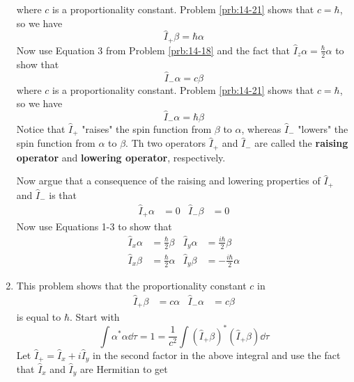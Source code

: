 \documentclass[../notes.tex]{subfiles}
\begin{document}
\begin{enumerate}[label={\textbf{14-\arabic*.}},ref={14-\arabic*}]
    where $c$ is a proportionality constant. Problem \ref{prb:14-21} shows that $c=\hbar$, so we have
    \begin{equation*}
        \hat{I}_+\beta = \hbar\alpha\tag{1}
    \end{equation*}
    Now use Equation 3 from Problem \ref{prb:14-18} and the fact that $\hat{I}_z\alpha=\frac{\hbar}{2}\alpha$ to show that
    \begin{equation*}
        \hat{I}_-\alpha = c\beta
    \end{equation*}
    where $c$ is a proportionality constant. Problem \ref{prb:14-21} shows that $c=\hbar$, so we have
    \begin{equation*}
        \hat{I}_-\alpha = \hbar\beta\tag{2}
    \end{equation*}
    Notice that $\hat{I}_+$ "raises" the spin function from $\beta$ to $\alpha$, whereas $\hat{I}_-$ "lowers" the spin function from $\alpha$ to $\beta$. Th two operators $\hat{I}_+$ and $\hat{I}_-$ are called the \textbf{raising operator} and \textbf{lowering operator}, respectively.\par
    Now argue that a consequence of the raising and lowering properties of $\hat{I}_+$ and $\hat{I}_-$ is that
    \begin{align*}
        \hat{I}_+\alpha &= 0&
        \hat{I}_-\beta &= 0\tag{3}
    \end{align*}
    Now use Equations 1-3 to show that
    \begin{align*}
        \hat{I}_x\alpha &= \frac{\hbar}{2}\beta&
        \hat{I}_y\alpha &= \frac{i\hbar}{2}\beta\\
        \hat{I}_x\beta &= \frac{\hbar}{2}\alpha&
        \hat{I}_y\beta &= -\frac{i\hbar}{2}\alpha
    \end{align*}
    \item \label{prb:14-21}This problem shows that the proportionality constant $c$ in
    \begin{align*}
        \hat{I}_+\beta &= c\alpha&
        \hat{I}_-\alpha &= c\beta
    \end{align*}
    is equal to $\hbar$. Start with
    \begin{equation*}
        \int\alpha^*\alpha\dd{\tau} = 1 = \frac{1}{c^2}\int(\hat{I}_+\beta)^*(\hat{I}_+\beta)\dd{\tau}
    \end{equation*}
    Let $\hat{I}_+=\hat{I}_x+i\hat{I}_y$ in the second factor in the above integral and use the fact that $\hat{I}_x$ and $\hat{I}_y$ are Hermitian to get
    \begin{equation*}

\end{equation*}
\end{enumerate}
\end{document}
